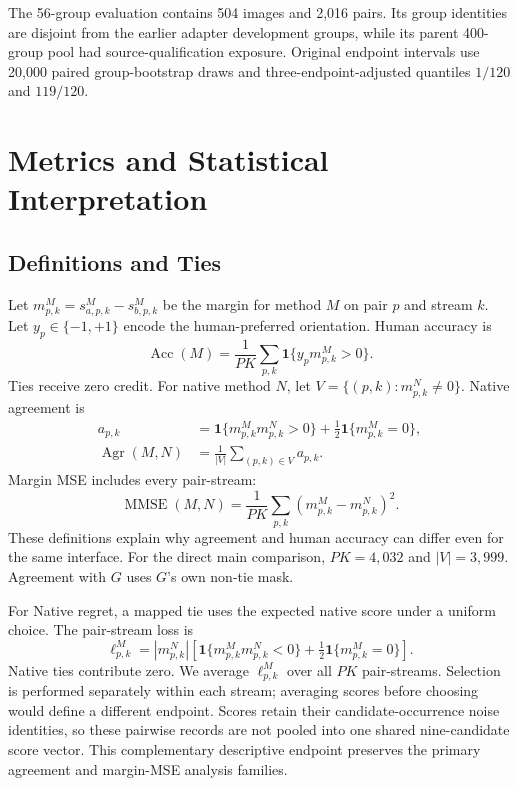 \documentclass[10pt,twocolumn,letterpaper]{article}
\begin{document}
The 56-group evaluation contains 504 images and 2,016 pairs. Its group identities are disjoint from the earlier adapter development groups, while its parent 400-group pool had source-qualification exposure. Original endpoint intervals use 20,000 paired group-bootstrap draws and three-endpoint-adjusted quantiles $1/120$ and $119/120$.

\section{Metrics and Statistical Interpretation}
\subsection{Definitions and Ties}
Let $m_{p,k}^{M}=s_{a,p,k}^{M}-s_{b,p,k}^{M}$ be the margin for method $M$ on pair $p$ and stream $k$. Let $y_p\in\{-1,+1\}$ encode the human-preferred orientation. Human accuracy is
\begin{equation}
 \operatorname{Acc}(M)=\frac1{PK}\sum_{p,k}\mathbf1\{y_pm_{p,k}^{M}>0\}.
\end{equation}
Ties receive zero credit. For native method $N$, let $V=\{(p,k):m_{p,k}^N\ne0\}$. Native agreement is
\begin{align}
 a_{p,k}&=\mathbf1\{m^M_{p,k}m^N_{p,k}>0\}+\tfrac12\mathbf1\{m^M_{p,k}=0\},\\
 \operatorname{Agr}(M,N)&=\frac1{|V|}\sum_{(p,k)\in V}a_{p,k}.
\end{align}
Margin MSE includes every pair-stream:
\begin{equation}
 \operatorname{MMSE}(M,N)=\frac1{PK}\sum_{p,k}(m^M_{p,k}-m^N_{p,k})^2.
\end{equation}
These definitions explain why agreement and human accuracy can differ even for the same interface. For the direct main comparison, $PK=4,032$ and $|V|=3,999$. Agreement with $G$ uses $G$'s own non-tie mask.

For Native regret, a mapped tie uses the expected native score under a uniform choice. The pair-stream loss is
\begin{equation}
 \ell_{p,k}^{M}=|m_{p,k}^{N}|\!\left[\mathbf1\{m_{p,k}^{M}m_{p,k}^{N}<0\}
 +\tfrac12\mathbf1\{m_{p,k}^{M}=0\}\right].
\end{equation}
Native ties contribute zero. We average $\ell_{p,k}^{M}$ over all $PK$ pair-streams. Selection is performed separately within each stream; averaging scores before choosing would define a different endpoint. Scores retain their candidate-occurrence noise identities, so these pairwise records are not pooled into one shared nine-candidate score vector. This complementary descriptive endpoint preserves the primary agreement and margin-MSE analysis families.
\end{document}
